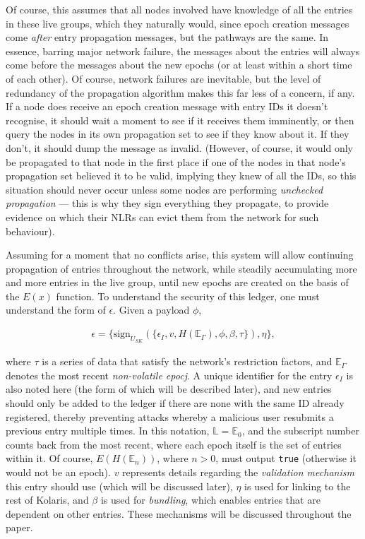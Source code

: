 \documentclass{extreport}
\begin{document}
Of course, this assumes that all nodes involved have knowledge of all the entries in these live groups, which they naturally would, since epoch creation messages come \emph{after} entry propagation messages, but the pathways are the same. In essence, barring major network failure, the messages about the entries will always come before the messages about the new epochs (or at least within a short time of each other). Of course, network failures are inevitable, but the level of redundancy of the propagation algorithm makes this far less of a concern, if any. If a node does receive an epoch creation message with entry IDs it doesn't recognise, it should wait a moment to see if it receives them imminently, or then query the nodes in its own propagation set to see if they know about it. If they don't, it should dump the message as invalid. (However, of course, it would only be propagated to that node in the first place if one of the nodes in that node's propagation set believed it to be valid, implying they knew of all the IDs, so this situation should never occur unless some nodes are performing \emph{unchecked propagation} --- this is why they sign everything they propagate, to provide evidence on which their NLRs can evict them from the network for such behaviour).

Assuming for a moment that no conflicts arise, this system will allow continuing propagation of entries throughout the network, while steadily accumulating more and more entries in the live group, until new epochs are created on the basis of the \(E(x)\) function. To understand the security of this ledger, one must understand the form of \(\epsilon\). Given a payload \(\phi\),

\begin{align*}
\epsilon = \{ \mathrm{sign}_{U_{SK}}( \{ \epsilon_I, v, H(\mathbb{E}_\Gamma), \phi, \beta, \tau \} ), \eta \}, \tag{3.3}
\end{align*}

where \(\tau\) is a series of data that satisfy the network's restriction factors, and \(\mathbb{E}_\Gamma\) denotes the most recent \emph{non-volatile epocj}. A unique identifier for the entry \(\epsilon_I\) is also noted here (the form of which will be described later), and new entries should only be added to the ledger if there are none with the same ID already registered, thereby preventing attacks whereby a malicious user resubmits a previous entry multiple times. In this notation, \(\mathbb{L} = \mathbb{E}_0\), and the subscript number counts back from the most recent, where each epoch itself is the set of entries within it. Of course, \(E(H(\mathbb{E}_n))\), where \(n > 0\), must output \texttt{true} (otherwise it would not be an epoch). \(v\) represents details regarding the \emph{validation mechanism} this entry should use (which will be discussed later), \(\eta\) is used for linking to the rest of Kolaris, and \(\beta\) is used for \emph{bundling}, which enables entries that are dependent on other entries. These mechanisms will be discussed throughout the paper.
\end{document}
